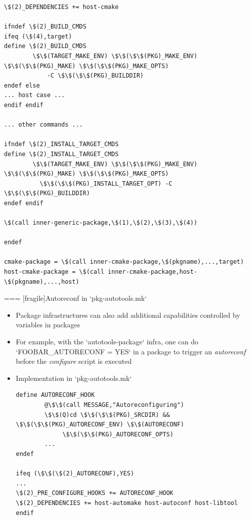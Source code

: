 \begin{block}{}
\begin{verbatim}
\$(2)_DEPENDENCIES += host-cmake

ifndef \$(2)_BUILD_CMDS
ifeq (\$(4),target)
define \$(2)_BUILD_CMDS
        \$\$(TARGET_MAKE_ENV) \$\$(\$\$(PKG)_MAKE_ENV) \$\$(\$\$(PKG)_MAKE) \$\$(\$\$(PKG)_MAKE_OPTS)
            -C \$\$(\$\$(PKG)_BUILDDIR)
endef else
... host case ...
endif endif

... other commands ...

ifndef \$(2)_INSTALL_TARGET_CMDS
define \$(2)_INSTALL_TARGET_CMDS
        \$\$(TARGET_MAKE_ENV) \$\$(\$\$(PKG)_MAKE_ENV) \$\$(\$\$(PKG)_MAKE) \$\$(\$\$(PKG)_MAKE_OPTS)
          \$\$(\$\$(PKG)_INSTALL_TARGET_OPT) -C \$\$(\$\$(PKG)_BUILDDIR)
endef endif

\$(call inner-generic-package,\$(1),\$(2),\$(3),\$(4))

endef

cmake-package = \$(call inner-cmake-package,\$(pkgname),...,target)
host-cmake-package = \$(call inner-cmake-package,host-\$(pkgname),...,host)
\end{verbatim}
\end{block}



=== [fragile]{Autoreconf in `pkg-autotools.mk`}
  \begin{itemize}
  \item Package infrastructures can also add additional capabilities
    controlled by variables in packages
  \item For example, with the `autotools-package` infra, one can
    do `FOOBAR_AUTORECONF = YES` in a package to trigger an {\em
      autoreconf} before the {\em configure} script is executed
  \item Implementation in `pkg-autotools.mk`
    \begin{block}{}
      \begin{verbatim}
define AUTORECONF_HOOK
        @\$\$(call MESSAGE,"Autoreconfiguring")
        \$\$(Q)cd \$\$(\$\$(PKG)_SRCDIR) && \$\$(\$\$(PKG)_AUTORECONF_ENV) \$\$(AUTORECONF)
             \$\$(\$\$(PKG)_AUTORECONF_OPTS)
        ...
endef

ifeq (\$\$(\$(2)_AUTORECONF),YES)
...
\$(2)_PRE_CONFIGURE_HOOKS += AUTORECONF_HOOK
\$(2)_DEPENDENCIES += host-automake host-autoconf host-libtool endif
      \end{verbatim}
    \end{block}
  \end{itemize}


